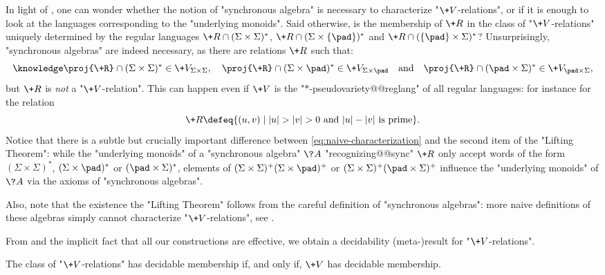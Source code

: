 \begin{remark}
	In light of ,
	one can wonder whether the notion of "synchronous algebra" is necessary to
	characterize "$\+V$-relations", or if it is enough to look at the languages corresponding to
	the "underlying monoids".
	Said otherwise, is the membership of $\+R$ in the class of "$\+V$-relations" uniquely
	determined by the regular languages $\+R \cap (\Sigma\times\Sigma)^*$,
	$\+R \cap (\Sigma\times\{\pad\})^*$ and $\+R \cap (\{\pad\}\times\Sigma)^*$?
	Unsurprisingly, "synchronous algebras" are indeed necessary, as 
	there are relations $\+R$ such that:
	\begin{equation}
		\AP\label{eq:naive-characterization}
		\proj{\+R} \cap (\Sigma\times \Sigma)^* \in \+V_{\Sigma\times \Sigma}, \quad
		\proj{\+R} \cap (\Sigma\times \pad)^* \in \+V_{\Sigma\times \pad}\quad\text{and}\quad
		\proj{\+R} \cap (\pad\times \Sigma)^* \in \+V_{\pad\times \Sigma},
	\end{equation}
	but $\+R$ is \emph{not} a "$\+V$-relation". This can happen even if
	$\+V$ is the "$\ast$-pseudovariety@@reglang" of all regular languages: for instance for the
	relation
	\[
		\+R \defeq \{(u,v) \mid |u| > |v| > 0 \text{ and } |u| - |v| \text{ is prime}\}.
	\]
	Notice that there is a subtle but crucially important difference between
	\eqref{eq:naive-characterization} and the second item of the "Lifting Theorem":
	while the "underlying monoids" of a "synchronous algebra" $\?A$ "recognizing@@sync" $\+R$
	only accept words of the form $(\Sigma\times \Sigma)^*$, $(\Sigma\times \pad)^*$
	or $(\pad\times \Sigma)^*$, elements of $(\Sigma\times \Sigma)^+(\Sigma\times \pad)^+$
	or $(\Sigma\times \Sigma)^+(\pad\times \Sigma)^+$ influence the "underlying monoids" of $\?A$
	via the axioms of "synchronous algebras".
\end{remark}

Also, note that the existence the "Lifting Theorem" follows from the careful
definition of "synchronous algebras": more naive definitions of these algebras
simply cannot characterize "$\+V$-relations", see .

From 
and the implicit fact that all our constructions are effective,
we obtain a decidability (meta-)result for
"$\+V$-relations".
\begin{corollary}
	\AP\label{coro:decidability}
	The class of "$\+V$-relations" has decidable membership if, and only if, $\+V$ has decidable membership.
\end{corollary}

